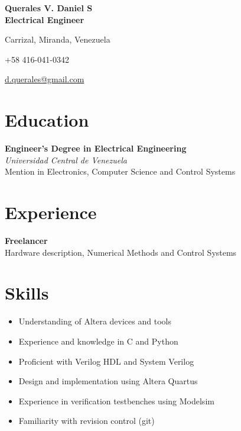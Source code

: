 \documentclass[11pt]{article} %
\def\ucv{Universidad Central de Venezuela}
\def\autor{Querales V. Daniel S}
\def\ee{Electrical Engineer}
\begin{document}
{\LARGE\bfseries \autor} \\ %
{\bfseries \ee}
\bigskip\bigskip\medskip %

Carrizal, Miranda, Venezuela %

+58 416-041-0342 %

\href{mailto:d.querales@gmail.com}{d.querales@gmail.com} %


\renewcommand{\abstractname}{}    %
\begin{abstract}
I am a Electrical Engineer (especializated in electronics) with two years of experience in FPGA design, synthesis and verification.
\end{abstract}
\section*{Education}

\textbf{Engineer's Degree in Electrical Engineering} \\ 
\emph{\ucv}\\
Mention in Electronics, Computer Science and Control Systems

\section*{Experience}

\textbf{Freelancer} \\ 
Hardware description, Numerical Methods and Control Systems 

\section*{Skills}

\begin{itemize}
\itemsep0em
\item Understanding of Altera devices and tools
\item Experience and knowledge in C and Python
\item Proficient with Verilog HDL and System Verilog
\item Design and implementation using Altera Quartus
\item Experience in verification testbenches using Modelsim
\item Familiarity with revision control (git)
\end{itemize}
\end{document}

